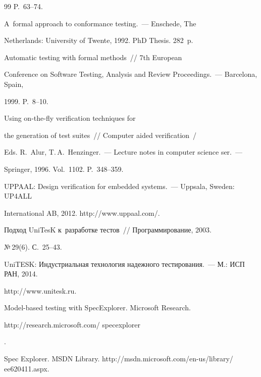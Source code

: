 {{\begin{thebibliography}{99}
P.~63--74.




 A~formal approach to conformance testing.~--- Enschede, The


Netherlands: University of Twente, 1992.  PhD Thesis. 282~p.




 Automatic testing with formal methods~/\!\!/ 7th European


Conference on Software Testing, Analysis and Review Proceedings.~--- Barcelona, Spain,


1999. P.~8--10.






Using on-the-fly verification techniques for


the generation of test suites~/\!\!/ Computer aided verification~/


Eds. R.~Alur, T.\,A.~Henzinger.~--- Lecture notes in computer science ser.~---


Springer, 1996. Vol.~1102. P.~348--359.




UPPAAL: Design verification for embedded systems.~--- Uppsala, Sweden: UP4ALL


International AB, 2012. {\sf http://www.uppaal.com/}.






 Подход UniTesK к~разработке тестов~/\!\!/ Программирование, 2003.


 №\,29(6). С.~25--43.




UniTESK: Индустриальная технология надежного тестирования.~--- М.: ИСП РАН, 2014.


{\sf http://www.unitesk.ru}.




Model-based testing with SpecExplorer. Microsoft Research. {\sf


http://research.\linebreak microsoft.com/ specexplorer}.




Spec Explorer. MSDN Library. {\sf http://msdn.microsoft.com/en-us/library/ ee620411.aspx}.



\end{thebibliography}}}
